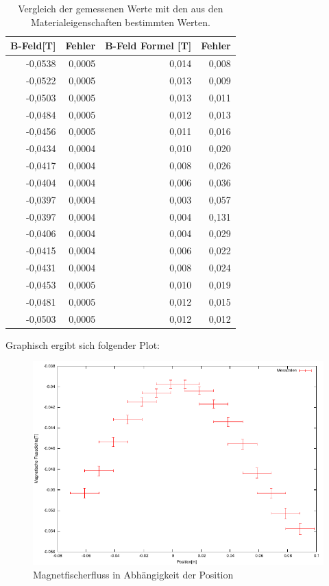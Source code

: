 \documentclass[12pt]{scrartcl}
\begin{document}
\begin{table}[htbp]
\caption{Vergleich der gemessenen Werte mit den aus den Materialeigenschaften bestimmten Werten.}
\begin{center}
\begin{tabular}{|r|r|r|r|}
\hline
\multicolumn{1}{|l|}{B-Feld[T]} & Fehler & \multicolumn{1}{l|}{B-Feld Formel [T]} & \multicolumn{1}{l|}{Fehler} \\ \hline
-0,0538 & 0,0005 & 0,014 & 0,008 \\ \hline
-0,0522 & 0,0005 & 0,013 & 0,009 \\ \hline
-0,0503 & 0,0005 & 0,013 & 0,011 \\ \hline
-0,0484 & 0,0005 & 0,012 & 0,013 \\ \hline
-0,0456 & 0,0005 & 0,011 & 0,016 \\ \hline
-0,0434 & 0,0004 & 0,010 & 0,020 \\ \hline
-0,0417 & 0,0004 & 0,008 & 0,026 \\ \hline
-0,0404 & 0,0004 & 0,006 & 0,036 \\ \hline
-0,0397 & 0,0004 & 0,003 & 0,057 \\ \hline
-0,0397 & 0,0004 & 0,004 & 0,131 \\ \hline
-0,0406 & 0,0004 & 0,004 & 0,029 \\ \hline
-0,0415 & 0,0004 & 0,006 & 0,022 \\ \hline
-0,0431 & 0,0004 & 0,008 & 0,024 \\ \hline
-0,0453 & 0,0005 & 0,010 & 0,019 \\ \hline
-0,0481 & 0,0005 & 0,012 & 0,015 \\ \hline
-0,0503 & 0,0005 & 0,012 & 0,012 \\ \hline
\end{tabular}
\end{center}
\label{aufgabe_4}
\end{table}

Graphisch ergibt sich folgender Plot:

\begin{figure}[htbp] 
  \centering
    \includegraphics[scale = 1.3]{aufgabe_4.pdf}
  	\caption[Magnetfischerfluss in Abhängigkeit der Position]{Magnetfischerfluss in Abhängigkeit der Position}
  \label{fig:kasten}
\end{figure}
\end{document}
